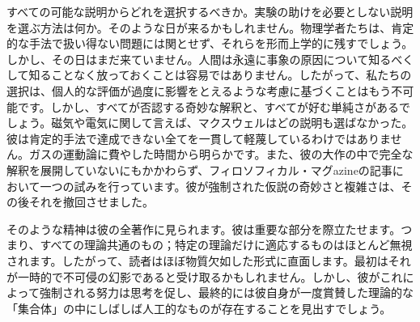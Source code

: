 \documentclass[a4paper,11pt,openany]{ltjsbook}
\begin{document}
すべての可能な説明からどれを選択するべきか。実験の助けを必要としない説明を選ぶ方法は何か。そのような日が来るかもしれません。物理学者たちは、肯定的な手法で扱い得ない問題には関とせず、それらを形而上学的に残すでしょう。しかし、その日はまだ来ていません。人間は永遠に事象の原因について知るべくして知ることなく放っておくことは容易ではありません。したがって、私たちの選択は、個人的な評価が過度に影響をとえるような考慮に基づくことはもう不可能です。しかし、すべてが否認する奇妙な解釈と、すべてが好む単純さがあるでしょう。磁気や電気に関して言えば、マクスウェルはどの説明も選ばなかった。彼は肯定的手法で達成できない全てを一貫して軽蔑しているわけではありません。ガスの運動論に費やした時間から明らかです。また、彼の大作の中で完全な解釈を展開していないにもかかわらず、フィロソフィカル・マグazineの記事において一つの試みを行っています。彼が強制された仮説の奇妙さと複雑さは、その後それを撤回させました。

そのような精神は彼の全著作に見られます。彼は重要な部分を際立たせます。つまり、すべての理論共通のもの；特定の理論だけに適応するものはほとんど無視されます。したがって、読者はほぼ物質欠如した形式に直面します。最初はそれが一時的で不可侵の幻影であると受け取るかもしれません。しかし、彼がこれによって強制される努力は思考を促し、最終的には彼自身が一度賞賛した理論的な「集合体」の中にしばしば人工的なものが存在することを見出すでしょう。
\end{document}
